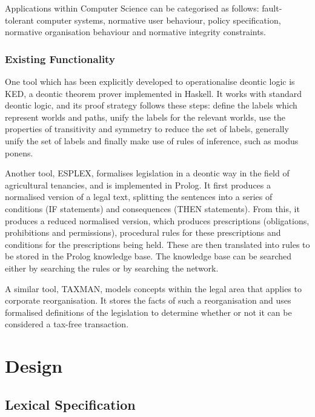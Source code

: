 \documentclass{l4proj}
\begin{document}
Applications within Computer Science can be categorised as follows\cite{meyer93applications}: fault-tolerant computer systems, normative user behaviour, policy specification, normative organisation behaviour and normative integrity constraints. 

\subsection{Existing Functionality}%
One tool which has been explicitly developed to operationalise deontic logic is KED\cite{KED}, a deontic theorem prover implemented in Haskell. It works with standard deontic logic, and its proof strategy follows these steps: define the labels which represent worlds and paths, unify the labels for the relevant worlds, use the properties of transitivity and symmetry to reduce the set of labels, generally unify the set of labels and finally make use of rules of inference, such as modus ponens. 

Another tool, ESPLEX, formalises legislation in a deontic way in the field of agricultural tenancies\cite{ESPLEX}, and is implemented in Prolog. It first produces a normalised version of a legal text, splitting the sentences into a series of conditions (IF statements) and consequences (THEN statements). From this, it produces a reduced normalised version, which produces prescriptions (obligations, prohibitions and permissions), procedural rules for these prescriptions and conditions for the prescriptions being held. These are then translated into rules to be stored in the Prolog knowledge base. The knowledge base can be searched either by searching the rules or by searching the network. 

A similar tool, TAXMAN, models concepts within the legal area that applies to corporate reorganisation\cite{TAXMAN}. It stores the facts of such a reorganisation and uses formalised definitions of the legislation to determine whether or not it can be considered a tax-free transaction. 

\chapter{Design}

\section{Lexical Specification}
\end{document}
